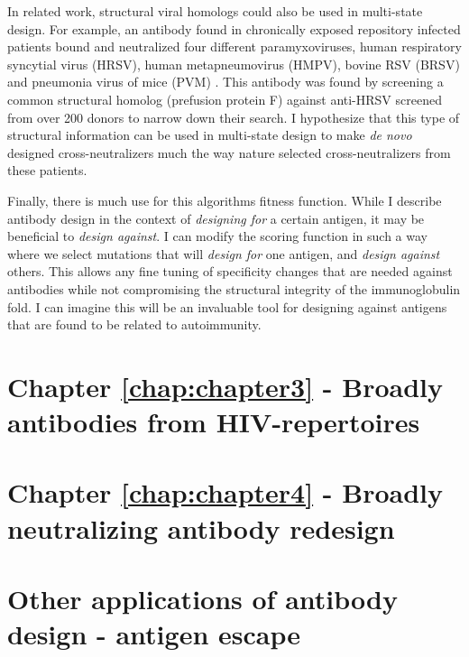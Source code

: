 In related work, structural viral homologs could also be used in multi-state design. For example, an antibody found in chronically exposed repository infected patients bound and neutralized four different paramyxoviruses, human respiratory syncytial virus (HRSV), human metapneumovirus (HMPV), bovine RSV (BRSV) and pneumonia virus of mice (PVM) \citep{Corti:2013cv}. This antibody was found by screening a common structural homolog (prefusion protein F) against anti-HRSV screened from over 200 donors to narrow down their search. I hypothesize that this type of structural information can be used in multi-state design to make \textit{de novo} designed cross-neutralizers much the way nature selected cross-neutralizers from these patients.

Finally, there is much use for this algorithms fitness function. While I describe antibody design in the context of \textit{designing for} a certain antigen, it may be beneficial to \textit{design against}. I can modify the scoring function in such a way where we select mutations that will \textit{design for} one antigen, and \textit{design against} others. This allows any fine tuning of specificity changes that are needed against antibodies while not compromising the structural integrity of the immunoglobulin fold. I can imagine this will be an invaluable tool for designing against antigens that are found to be related to autoimmunity.

\section{Chapter \ref{chap:chapter3} - Broadly antibodies from HIV-\naive repertoires}


\section{Chapter \ref{chap:chapter4} - Broadly neutralizing antibody redesign}
\section{Other applications of antibody design - antigen escape}